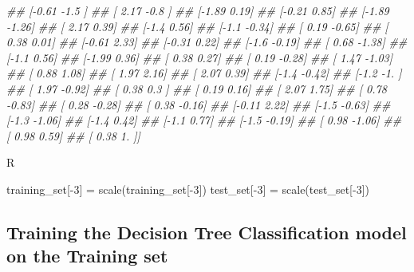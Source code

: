 \documentclass[
]{book}
\newenvironment{Shaded}{\begin{snugshade}}{\end{snugshade}}
\newcommand{\CommentTok}[1]{\textcolor[rgb]{0.56,0.35,0.01}{\textit{#1}}}
\newcommand{\DecValTok}[1]{\textcolor[rgb]{0.00,0.00,0.81}{#1}}
\newcommand{\FunctionTok}[1]{\textcolor[rgb]{0.00,0.00,0.00}{#1}}
\newcommand{\NormalTok}[1]{#1}
\newcommand{\OtherTok}[1]{\textcolor[rgb]{0.56,0.35,0.01}{#1}}
\newcommand{\SpecialCharTok}[1]{\textcolor[rgb]{0.00,0.00,0.00}{#1}}
\theoremstyle{definition}
\theoremstyle{definition}
\theoremstyle{definition}
\theoremstyle{definition}
\theoremstyle{remark}
\begin{document}
\begin{Shaded}
\begin{Highlighting}[]
\CommentTok{\#\#  [{-}0.61 {-}1.5 ]}
\CommentTok{\#\#  [ 2.17 {-}0.8 ]}
\CommentTok{\#\#  [{-}1.89  0.19]}
\CommentTok{\#\#  [{-}0.21  0.85]}
\CommentTok{\#\#  [{-}1.89 {-}1.26]}
\CommentTok{\#\#  [ 2.17  0.39]}
\CommentTok{\#\#  [{-}1.4   0.56]}
\CommentTok{\#\#  [{-}1.1  {-}0.34]}
\CommentTok{\#\#  [ 0.19 {-}0.65]}
\CommentTok{\#\#  [ 0.38  0.01]}
\CommentTok{\#\#  [{-}0.61  2.33]}
\CommentTok{\#\#  [{-}0.31  0.22]}
\CommentTok{\#\#  [{-}1.6  {-}0.19]}
\CommentTok{\#\#  [ 0.68 {-}1.38]}
\CommentTok{\#\#  [{-}1.1   0.56]}
\CommentTok{\#\#  [{-}1.99  0.36]}
\CommentTok{\#\#  [ 0.38  0.27]}
\CommentTok{\#\#  [ 0.19 {-}0.28]}
\CommentTok{\#\#  [ 1.47 {-}1.03]}
\CommentTok{\#\#  [ 0.88  1.08]}
\CommentTok{\#\#  [ 1.97  2.16]}
\CommentTok{\#\#  [ 2.07  0.39]}
\CommentTok{\#\#  [{-}1.4  {-}0.42]}
\CommentTok{\#\#  [{-}1.2  {-}1.  ]}
\CommentTok{\#\#  [ 1.97 {-}0.92]}
\CommentTok{\#\#  [ 0.38  0.3 ]}
\CommentTok{\#\#  [ 0.19  0.16]}
\CommentTok{\#\#  [ 2.07  1.75]}
\CommentTok{\#\#  [ 0.78 {-}0.83]}
\CommentTok{\#\#  [ 0.28 {-}0.28]}
\CommentTok{\#\#  [ 0.38 {-}0.16]}
\CommentTok{\#\#  [{-}0.11  2.22]}
\CommentTok{\#\#  [{-}1.5  {-}0.63]}
\CommentTok{\#\#  [{-}1.3  {-}1.06]}
\CommentTok{\#\#  [{-}1.4   0.42]}
\CommentTok{\#\#  [{-}1.1   0.77]}
\CommentTok{\#\#  [{-}1.5  {-}0.19]}
\CommentTok{\#\#  [ 0.98 {-}1.06]}
\CommentTok{\#\#  [ 0.98  0.59]}
\CommentTok{\#\#  [ 0.38  1.  ]]}
\end{Highlighting}
\end{Shaded}

R

\begin{Shaded}
\begin{Highlighting}[]
\NormalTok{training\_set[}\SpecialCharTok{{-}}\DecValTok{3}\NormalTok{] }\OtherTok{=} \FunctionTok{scale}\NormalTok{(training\_set[}\SpecialCharTok{{-}}\DecValTok{3}\NormalTok{])}
\NormalTok{test\_set[}\SpecialCharTok{{-}}\DecValTok{3}\NormalTok{] }\OtherTok{=} \FunctionTok{scale}\NormalTok{(test\_set[}\SpecialCharTok{{-}}\DecValTok{3}\NormalTok{])}
\end{Highlighting}
\end{Shaded}

\hypertarget{training-the-decision-tree-classification-model-on-the-training-set}{%
\subsection{Training the Decision Tree Classification model on the Training set}\label{training-the-decision-tree-classification-model-on-the-training-set}}
\end{document}
